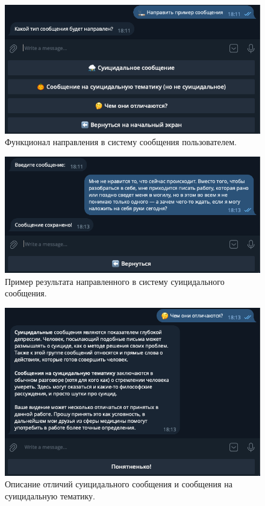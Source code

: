 \begin{figure}[H]
	\centering
	\includegraphics[width=\textwidth]{inc/teleg2.png}
	\caption{ Функционал направления в систему сообщения пользователем. }
	\label{img:teleg2}
\end{figure}

\begin{figure}[H]
	\centering
	\includegraphics[width=\textwidth]{inc/teleg3.png}
	\caption{ Пример результата направленного в систему суицидального сообщения. }
	\label{img:teleg3}
\end{figure}

\begin{figure}[H]
	\centering
	\includegraphics[width=\textwidth]{inc/teleg4.png}
	\caption{ Описание отличий суицидального сообщения и сообщения на суицидальную тематику. }
	\label{img:teleg4}
\end{figure}

